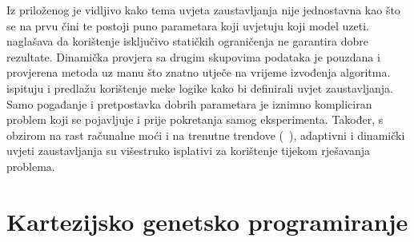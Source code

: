 Iz priloženog je vidljivo kako tema uvjeta zaustavljanja nije jednostavna kao što se na prvu čini te postoji puno parametara koji uvjetuju koji model uzeti.
~\cite{ga_stopping_criteria} naglašava da korištenje isključivo statičkih ograničenja ne garantira dobre rezultate.
Dinamička provjera sa drugim skupovima podataka je pouzdana i provjerena metoda uz manu što znatno utječe na vrijeme izvođenja algoritma.
~\cite{fuzzy_logic} ispituju i predlažu korištenje meke logike kako bi definirali uvjet zaustavljanja.
Samo pogađanje i pretpostavka dobrih parametara je iznimno kompliciran problem koji se pojavljuje i prije pokretanja samog eksperimenta.
Također, s obzirom na rast računalne moći i na trenutne trendove (~\cite{ga_stopping_criteria}), adaptivni i dinamički uvjeti zaustavljanja su višestruko isplativi za korištenje tijekom rješavanja problema.

\section{Kartezijsko genetsko programiranje}

